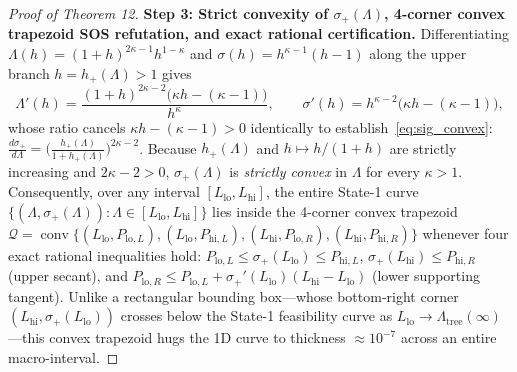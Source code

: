 \documentclass[10pt,letterpaper]{article}
\begin{document}
\begin{proof}[Proof of Theorem 12]
\textbf{Step 3: Strict convexity of $\sigma_+(\Lambda)$, 4-corner convex trapezoid SOS refutation, and exact rational certification.}
Differentiating $\Lambda(h) = (1+h)^{2\kappa-1} h^{1-\kappa}$ and $\sigma(h) = h^{\kappa-1}(h - 1)$ along the upper branch $h = h_+(\Lambda) > 1$ gives
\[
  \Lambda'(h) = \frac{(1+h)^{2\kappa-2}\bigl(\kappa h - (\kappa - 1)\bigr)}{h^\kappa},
  \qquad
  \sigma'(h) = h^{\kappa - 2}\bigl(\kappa h - (\kappa - 1)\bigr),
\]
whose ratio cancels $\kappa h - (\kappa - 1) > 0$ identically to establish~\eqref{eq:sig_convex}: $\frac{d\sigma_+}{d\Lambda} = \bigl(\frac{h_+(\Lambda)}{1 + h_+(\Lambda)}\bigr)^{2\kappa - 2}$. Because $h_+(\Lambda)$ and $h \mapsto h/(1+h)$ are strictly increasing and $2\kappa - 2 > 0$, $\sigma_+(\Lambda)$ is \emph{strictly convex} in $\Lambda$ for every $\kappa > 1$. Consequently, over any interval $[L_{\mathrm{lo}}, L_{\mathrm{hi}}]$, the entire State-1 curve $\{(\Lambda, \sigma_+(\Lambda)) : \Lambda \in [L_{\mathrm{lo}}, L_{\mathrm{hi}}]\}$ lies inside the 4-corner convex trapezoid $\mathcal{Q} = \operatorname{conv}\{(L_{\mathrm{lo}}, P_{\mathrm{lo},L}), (L_{\mathrm{lo}}, P_{\mathrm{hi},L}), (L_{\mathrm{hi}}, P_{\mathrm{lo},R}), (L_{\mathrm{hi}}, P_{\mathrm{hi},R})\}$ whenever four exact rational inequalities hold: $P_{\mathrm{lo},L} \le \sigma_+(L_{\mathrm{lo}}) \le P_{\mathrm{hi},L}$, $\sigma_+(L_{\mathrm{hi}}) \le P_{\mathrm{hi},R}$ (upper secant), and $P_{\mathrm{lo},R} \le P_{\mathrm{lo},L} + \sigma_+'(L_{\mathrm{lo}})(L_{\mathrm{hi}} - L_{\mathrm{lo}})$ (lower supporting tangent). Unlike a rectangular bounding box—whose bottom-right corner $(L_{\mathrm{hi}}, \sigma_+(L_{\mathrm{lo}}))$ crosses below the State-1 feasibility curve as $L_{\mathrm{lo}} \to \Lambda_{\mathrm{tree}}(\infty)$—this convex trapezoid hugs the 1D curve to thickness $\approx 10^{-7}$ across an entire macro-interval.


\end{proof}
\end{document}
